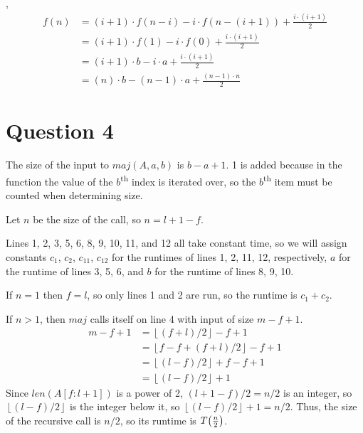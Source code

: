 \documentclass[12pt]{article}
\newcommand{\cleft}{\mathopen{}\mathclose\bgroup\left}
\newcommand{\cright}{\aftergroup\egroup\right}
\newcommand{\floor}[1]{\left\lfloor #1 \right\rfloor}
\newcommand{\supth}{\textsuperscript{th}}
\begin{document}
,
\begin{align*}
    f(n) &= (i+1) \cdot f(n-i) - i \cdot f(n-(i+1)) + \frac{i \cdot (i+1)}{2} \\
    &= (i+1) \cdot f(1) - i \cdot f(0) + \frac{i \cdot (i+1)}{2} \\
    &= (i+1) \cdot b - i \cdot a + \frac{i \cdot (i+1)}{2}\\
    &= (n) \cdot b - (n-1) \cdot a + \frac{(n-1) \cdot n}{2}\tag{Since $i + 1 = n$}
\end{align*}


\newpage
\section*{Question 4}

The size of the input to $maj(A, a, b)$ is $b - a + 1$. 1 is added because in the function the value of the $b$\supth{} index is iterated over, so the $b$\supth{} item must be counted when determining size.

\hfill

Let $n$ be the size of the call, so $n = l + 1 - f$.

Lines 1, 2, 3, 5, 6, 8, 9, 10, 11, and 12 all take constant time, so we will assign constants $c_1$, $c_2$, $c_{11}$, $c_{12}$ for the runtimes of lines 1, 2, 11, 12, respectively, $a$ for the runtime of lines 3, 5, 6, and $b$ for the runtime of lines 8, 9, 10.
    
If $n = 1$ then $f = l$, so only lines 1 and 2 are run, so the runtime is $c_1 + c_2$.

If $n > 1$, then $maj$ calls itself on line 4 with input of size $m - f + 1$.
\begin{align*}
    m - f + 1 &= \floor{(f + l) / 2} - f + 1 \\
    &= \floor{f - f + (f + l) / 2} - f + 1 \\
    &= \floor{(l - f) / 2} + f - f + 1 \\
    &= \floor{(l - f) / 2} + 1
\end{align*}
Since $len(A[f:l + 1])$ is a power of 2, $(l + 1 - f) / 2 = n / 2$ is an integer, so $\floor{(l - f) / 2}$ is the integer below it, so $\floor{(l - f) / 2} + 1 = n / 2$. Thus, the size of the recursive call is $n / 2$, so its runtime is $T\cleft(\frac{n}{2}\cright)$.
\end{document}
